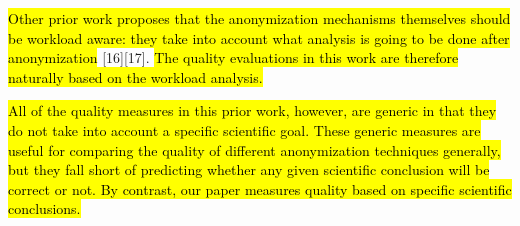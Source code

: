 \documentclass[10pt]{article}
\newif\ifcolor
\newcommand{\mycite}[1]{[#1]}
\begin{document}
\hl{Other prior work proposes that the anonymization mechanisms themselves should be workload aware: they take into account what analysis is going to be done after anonymization} \mycite{16}\mycite{17}. \hl{The quality evaluations in this work are therefore naturally based on the workload analysis.}


\hl{All of the quality measures in this prior work, however, are generic in that they do not take into account a specific scientific goal. These generic measures are useful for comparing the quality of different anonymization techniques generally, but they fall short of predicting whether any given scientific conclusion will be correct or not. By contrast, our paper measures quality based on specific scientific conclusions.}


      \setlength{\fboxsep}{0pt}
\end{document}
